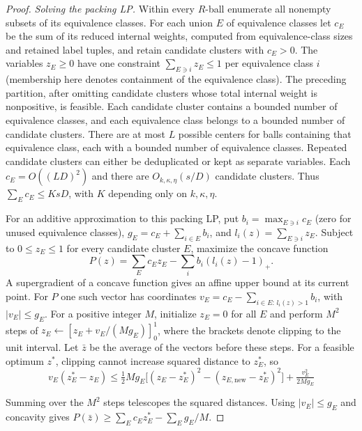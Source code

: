 \documentclass[11pt]{article}
\begin{document}
\begin{proof}
\emph{Solving the packing LP.}
Within every $R$-ball enumerate all nonempty subsets of its equivalence classes.
For each union $E$ of equivalence classes let $c_E$ be the sum of its reduced internal weights,
computed from equivalence-class sizes and retained label tuples, and retain candidate clusters with
$c_E>0$. The variables $z_E\ge0$ have one constraint
$\sum_{E\ni i}z_E\le1$ per equivalence class $i$ (membership here denotes containment
of the equivalence class). The preceding partition, after omitting candidate clusters
whose total internal weight is nonpositive, is feasible. Each candidate cluster contains a
bounded number of equivalence classes, and each
equivalence class belongs to a bounded number of candidate clusters. There are
at most $L$ possible centers for balls containing that equivalence class, each with
a bounded number of equivalence classes. Repeated candidate clusters can either be
deduplicated or kept as separate variables. Each $c_E=O((LD)^2)$ and
there are $O_{k,\kappa,\eta}(s/D)$ candidate clusters. Thus
$\sum_E c_E\le K sD$, with $K$ depending only on $k,\kappa,\eta$.

For an additive approximation to this packing LP, put
$b_i=\max_{E\ni i}c_E$ (zero for unused equivalence classes),
$g_E=c_E+\sum_{i\in E}b_i$, and $l_i(z)=\sum_{E\ni i}z_E$.
Subject to $0\le z_E\le1$ for every candidate cluster $E$, maximize
the concave function
\[
 P(z)=\sum_E c_Ez_E-\sum_i b_i(l_i(z)-1)_+ .
\]
A supergradient of a concave function gives an affine upper bound
at its current point. For $P$ one such vector has coordinates
$v_E=c_E-\sum_{i\in E:\,l_i(z)>1}b_i$, with $|v_E|\le g_E$.
For a positive integer $M$, initialize $z_E=0$ for all $E$ and perform $M^2$ steps of
$z_E\leftarrow[z_E+v_E/(Mg_E)]_0^1$, where the brackets denote clipping
to the unit interval. Let $\bar z$ be the average of the vectors
before these steps. For a feasible optimum $z^*$, clipping cannot
increase squared distance to $z_E^*$, so
\[
 v_E(z_E^*-z_E)\le
 \tfrac12 M g_E\big[(z_E-z_E^*)^2-(z_{E,\mathrm{new}}-z_E^*)^2\big]
 +\tfrac{v_E^2}{2Mg_E}
\]

Summing over the $M^2$ steps telescopes the squared distances.
Using $|v_E|\le g_E$ and concavity gives
$P(\bar z)\ge\sum_E c_E z_E^*-\sum_E g_E/M$.


\end{proof}
\end{document}
